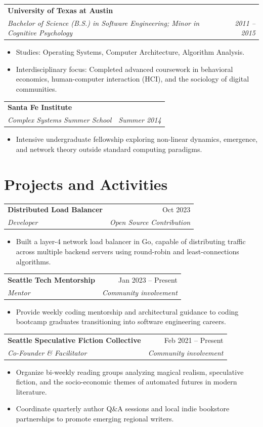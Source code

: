 \documentclass[10pt,letterpaper]{article}
\makeatletter
\newcommand{\entry}[4]{%
  \begin{tabularx}{\linewidth}{@{}X r@{}}
    \textbf{#1} & #2 \\
    \textit{#3} & \textit{#4} \\
  \end{tabularx}%
}
\makeatother
\begin{document}
\entry{University of Texas at Austin}{}
      {Bachelor of Science (B.S.) in Software Engineering; Minor in Cognitive Psychology}{2011 -- 2015}
\begin{itemize}
  \item Studies: Operating Systems, Computer Architecture, Algorithm Analysis.
  \item Interdisciplinary focus: Completed advanced coursework in behavioral economics, human-computer interaction (HCI), and the sociology of digital communities.
\end{itemize}

\entry{Santa Fe Institute}{}
      {Complex Systems Summer School}{Summer 2014}
\begin{itemize}
  \item Intensive undergraduate fellowship exploring non-linear dynamics, emergence, and network theory outside standard computing paradigms.
\end{itemize}

\section{Projects and Activities}

\entry{Distributed Load Balancer}{Oct 2023}
      {Developer}{Open Source Contribution}
\begin{itemize}
  \item Built a layer-4 network load balancer in Go, capable of distributing traffic across multiple backend servers using round-robin and least-connections algorithms.
\end{itemize}

\entry{Seattle Tech Mentorship}{Jan 2023 -- Present}
      {Mentor}{Community involvement}
\begin{itemize}
  \item Provide weekly coding mentorship and architectural guidance to coding bootcamp graduates transitioning into software engineering careers.
\end{itemize}

\entry{Seattle Speculative Fiction Collective}{Feb 2021 -- Present}
      {Co-Founder \& Facilitator}{Community involvement}
\begin{itemize}
  \item Organize bi-weekly reading groups analyzing magical realism, speculative fiction, and the socio-economic themes of automated futures in modern literature.
  \item Coordinate quarterly author Q\&A sessions and local indie bookstore partnerships to promote emerging regional writers.
\end{itemize}
\end{document}

